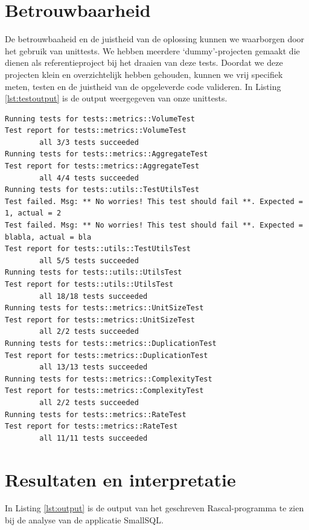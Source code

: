 \documentclass[a4paper]{article}
\begin{document}
\section{Betrouwbaarheid}
De betrouwbaaheid en de juistheid van de oplossing kunnen we waarborgen door het gebruik van unittests. 
We hebben meerdere `dummy'-projecten gemaakt die dienen als referentieproject bij het draaien van deze tests. 
Doordat we deze projecten klein en overzichtelijk hebben gehouden, kunnen we vrij specifiek meten, testen en de juistheid van de opgeleverde code valideren. In Listing \ref{lst:testoutput} is de output weergegeven van onze unittests.
\begin{lstlisting}[caption={Unit test output},label={lst:testoutput},frame = single]
Running tests for tests::metrics::VolumeTest
Test report for tests::metrics::VolumeTest                                                
        all 3/3 tests succeeded
Running tests for tests::metrics::AggregateTest
Test report for tests::metrics::AggregateTest                                             
        all 4/4 tests succeeded
Running tests for tests::utils::TestUtilsTest
Test failed. Msg: ** No worries! This test should fail **. Expected = 1, actual = 2       
Test failed. Msg: ** No worries! This test should fail **. Expected = blabla, actual = bla
Test report for tests::utils::TestUtilsTest                                 
        all 5/5 tests succeeded
Running tests for tests::utils::UtilsTest
Test report for tests::utils::UtilsTest                                                     
        all 18/18 tests succeeded
Running tests for tests::metrics::UnitSizeTest
Test report for tests::metrics::UnitSizeTest                                              
        all 2/2 tests succeeded
Running tests for tests::metrics::DuplicationTest
Test report for tests::metrics::DuplicationTest                                             
        all 13/13 tests succeeded
Running tests for tests::metrics::ComplexityTest
Test report for tests::metrics::ComplexityTest                                            
        all 2/2 tests succeeded
Running tests for tests::metrics::RateTest
Test report for tests::metrics::RateTest                                                    
        all 11/11 tests succeeded
\end{lstlisting}
\section{Resultaten en interpretatie}
In Listing \ref{lst:output} is de output van het geschreven Rascal-programma te zien bij de analyse van de 
applicatie SmallSQL. 
\end{document}
